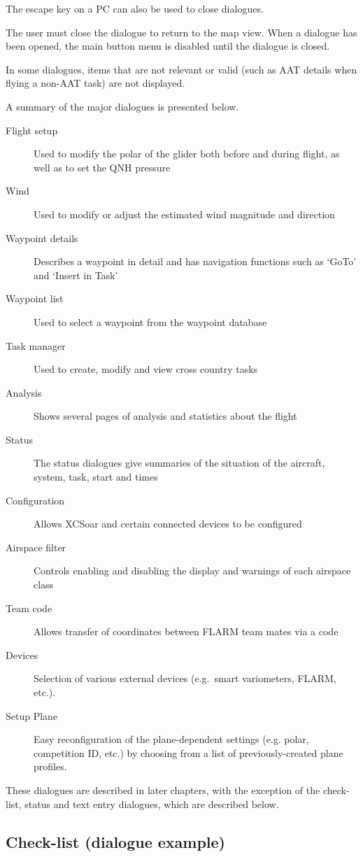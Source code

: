 The escape key on a PC can also be used to close dialogues.

The user must close the dialogue to return to the map view. When a dialogue
has been opened, the main button menu is disabled until the dialogue is closed.

In some dialogues, items that are not relevant or valid (such as AAT details when
flying a non-AAT task) are not displayed.

A summary of the major dialogues is presented below.
\begin{description}
\item[Flight setup] Used to modify the polar of the glider both before and
during flight, as well as to set the QNH pressure
\item[Wind] Used to modify or adjust the estimated wind magnitude and direction
\item[Waypoint details] Describes a waypoint in detail and has navigation
functions such as `GoTo' and `Insert in Task'
\item[Waypoint list] Used to select a waypoint from the waypoint database
\item[Task manager] Used to create, modify and view cross country tasks
\item[Analysis] Shows several pages of analysis and statistics about the flight
\item[Status] The status dialogues give summaries of the situation of the 
aircraft, system, task, start and times
\item[Configuration] Allows XCSoar and certain connected devices to be
configured
\item[Airspace filter] Controls enabling and disabling the display and warnings
of each airspace class
\item[Team code] Allows transfer of coordinates between FLARM team mates via a 
  code
\item[Devices]  Selection of various external devices (e.g.\ smart variometers,
  FLARM, etc.).
\item[Setup Plane]  Easy reconfiguration of the plane-dependent settings (e.g. 
  polar, competition ID, etc.) by choosing from a list of previously-created 
  plane profiles.
\end{description}

These dialogues are described in later chapters, with the exception of the
check-list, status and text entry dialogues, which are described below.


\subsection*{Check-list (dialogue example)}\label{sec:checklist}

